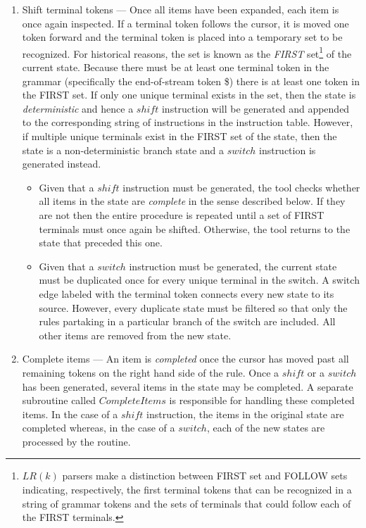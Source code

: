 \documentclass[envcountsame,runningheads]{llncs}
\begin{document}
\begin{enumerate}
\item Shift terminal tokens --- Once all items have been expanded, each item is once again inspected. 
If a terminal token follows the cursor, it is moved one token forward and the terminal token is placed into a temporary set to be recognized.
For historical reasons, the set is known as the \emph{FIRST} set\footnote{$LR(k)$ parsers make a distinction between FIRST set and FOLLOW sets indicating, respectively, 
the first terminal tokens that can be recognized in a string of grammar tokens and the sets of terminals that could follow each of the FIRST terminals.} of the current state.
Because there must be at least one terminal token in the grammar (specifically the end-of-stream token \$) there is at least one token in the FIRST set.
If only one unique terminal exists in the set, then the state is \emph{deterministic} and hence a $shi\!ft$ instruction will be generated and appended to the corresponding string of instructions in the instruction table.
However, if multiple unique terminals exist in the FIRST set of the state, then the state is a non-deterministic branch state and a $switch$ instruction is generated instead.
\begin{itemize}
\item Given that a $shi\!ft$ instruction must be generated, the tool checks whether all items in the state are \emph{complete} in the sense described below. 
If they are not then the entire procedure is repeated until a set of FIRST terminals must once again be shifted. 
Otherwise, the tool returns to the state that preceded this one.
\item Given that a $switch$ instruction must be generated, the current state must be duplicated once for every unique terminal in the switch. 
A switch edge labeled with the terminal token connects every new state to its source.
However, every duplicate state must be filtered so that only the rules partaking in a particular branch of the switch are included.
All other items are removed from the new state. %
\end{itemize}

\item Complete items --- An item is \emph{completed} once the cursor has moved past all remaining tokens on the right hand side of the rule.
Once a $shi\!ft$ or a $switch$ has been generated, several items in the state may be completed. 
A separate subroutine called $CompleteItems$ is responsible for handling these completed items.
In the case of a $shi\!ft$ instruction, the items in the original state are completed whereas, in the case of a $switch$, each of the new states are processed by the routine.\\


\end{enumerate}
\end{document}
